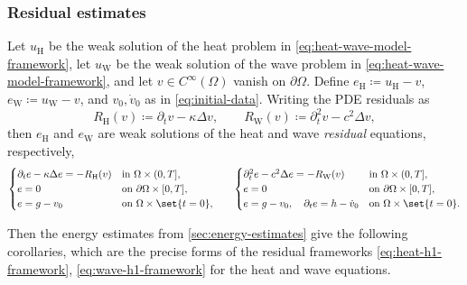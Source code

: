 \subsubsection{Residual estimates}
Let $u_{\mathrm H}$ be the weak solution of the heat problem in
\eqref{eq:heat-wave-model-framework}, let $u_{\mathrm W}$ be the weak solution
of the wave problem in \eqref{eq:heat-wave-model-framework}, and let
$v \in C^\infty(\Omega)$ vanish on \(\partial\Omega\).
Define
$e_{\mathrm H}\coloneqq u_{\mathrm H}-v$, $e_{\mathrm W}\coloneqq u_{\mathrm W}-v$,
and $v_0, \dot v_0$ as in \eqref{eq:initial-data}. Writing the PDE residuals as
\[
    R_{\mathrm H}(v)\coloneqq \partial_t v-\kappa\Delta v,
    \qquad
    R_{\mathrm W}(v)\coloneqq \partial_t^2v-c^2\Delta v,
\]
then \(e_{\mathrm H}\) and \(e_{\mathrm W}\) are weak solutions of the heat and
wave \emph{residual} equations, respectively,
\begin{equation}\label{eq:heat-wave-residual}
\begin{array}{@{}c@{\qquad}c@{}}
\begin{cases}
\partial_t e-\kappa\Delta e=-R_{\mathrm H}(v) & \text{in }\Omega\times(0,T],\\
e=0 & \text{on }\partial\Omega\times[0,T],\\
e=g-v_0 & \text{on }\Omega\times\set{t=0},
\end{cases}
&
\begin{cases}
\partial_t^2 e-c^2\Delta e=-R_{\mathrm W}(v) & \text{in }\Omega\times(0,T],\\
e=0 & \text{on }\partial\Omega\times[0,T],\\
e=g-v_0,\quad \partial_t e=h-\dot v_0 & \text{on }\Omega\times\set{t=0}.
\end{cases}
\end{array}
\end{equation}

Then the energy estimates from \cref{sec:energy-estimates} give the following corollaries, which are the precise forms of the residual frameworks \eqref{eq:heat-h1-framework}, \eqref{eq:wave-h1-framework} for the heat and wave equations.

